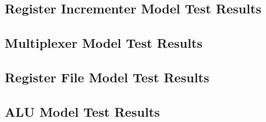 \documentclass{article}
\begin{document}
\subsection{Register Incrementer Model Test Results}

\subsection{Multiplexer Model Test Results}

\subsection{Register File Model Test Results}

\subsection{ALU Model Test Results}

\end{document}
